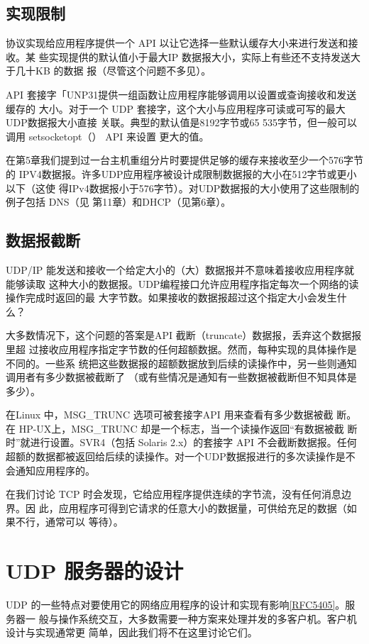 \subsection{实现限制}
协议实现给应用程序提供一个 API 以让它选择一些默认缓存大小来进行发送和接收。某
些实现提供的默认值小于最大IP 数据报大小，实际上有些还不支持发送大于几十KB 的数据
报（尽管这个问题不多见）。

API 套接字「UNP31提供一组函数让应用程序能够调用以设置或查询接收和发送缓存的
大小。对于一个 UDP 套接字，这个大小与应用程序可读或可写的最大 UDP数据报大小直接
关联。典型的默认值是8192字节或65 535字节，但一般可以调用 setsocketopt（） API 来设置
更大的值。

在第5章我们提到过一台主机重组分片时要提供足够的缓存来接收至少一个576字节的
IPV4数据报。许多UDP应用程序被设计成限制数据报的大小在512字节或更小以下（这使
得IPv4数据报小于576字节）。对UDP数据报的大小使用了这些限制的例子包括 DNS（见
第11章）和DHCP（见第6章）。

\subsection{数据报截断}
UDP/IP 能发送和接收一个给定大小的（大）数据报并不意味着接收应用程序就能够读取
这种大小的数据报。UDP编程接口允许应用程序指定每次一个网络的读操作完成时返回的最
大字节数。如果接收的数据报超过这个指定大小会发生什么？

大多数情况下，这个问题的答案是API 截断（truncate）数据报，丢弃这个数据报里超
过接收应用程序指定字节数的任何超额数据。然而，每种实现的具体操作是不同的。一些系
统把这些数据报的超额数据放到后续的读操作中，另一些则通知调用者有多少数据被截断了
（或有些情况是通知有一些数据被截断但不知具体是多少）。

\begin{tcolorbox}
  在Linux 中，MSG\_TRUNC 选项可被套接字API 用来查看有多少数据被截
  断。在 HP-UX上，MSG\_TRUNC 却是一个标志，当一个读操作返回“有数据被截
  断时”就进行设置。SVR4（包括 Solaris 2.x）的套接字 API 不会截断数据报。任何
  超额的数据都被返回给后续的读操作。对一个UDP数据报进行的多次读操作是不
  会通知应用程序的。
\end{tcolorbox}

在我们讨论 TCP 时会发现，它给应用程序提供连续的字节流，没有任何消息边界。因
此，应用程序可得到它请求的任意大小的数据量，可供给充足的数据（如果不行，通常可以
等待）。

\section{UDP 服务器的设计}
UDP
的一些特点对要使用它的网络应用程序的设计和实现有影响\href{https://www.rfc-editor.org/rfc/rfc5405}{[RFC5405]}。服务器一
般与操作系统交互，大多数需要一种方案来处理并发的多客户机。客户机设计与实现通常更
简单，因此我们将不在这里讨论它们。

